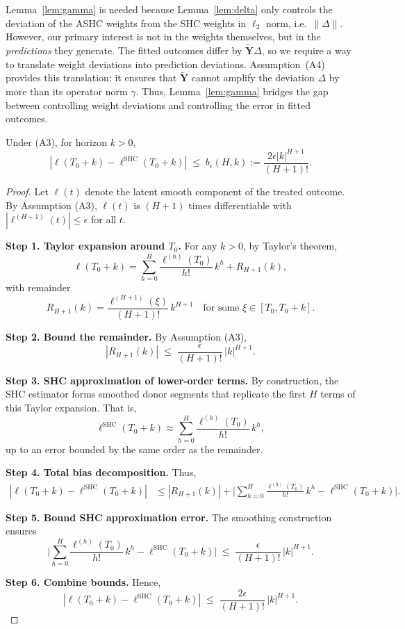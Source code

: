 \documentclass{article}
\begin{document}
\begin{remark}
Lemma~\ref{lem:gamma} is needed because Lemma~\ref{lem:delta} only controls the
deviation of the ASHC weights from the SHC weights in $\ell_2$ norm,
i.e.\ $\|\Delta\|$. However, our primary interest is not in the weights
themselves, but in the \emph{predictions} they generate. The fitted outcomes
differ by $\widetilde{\mathbf{Y}}\Delta$, so we require a way to translate
weight deviations into prediction deviations. Assumption~(A4) provides this
translation: it ensures that $\widetilde{\mathbf{Y}}$ cannot amplify the
deviation $\Delta$ by more than its operator norm $\gamma$. Thus, Lemma~\ref{lem:gamma}
bridges the gap between controlling weight deviations and controlling the error
in fitted outcomes.
\end{remark}


\begin{lemma}
\label{lem:smoothness}
Under (A3), for horizon $k > 0$,
\[
|\ell(T_0 + k) - \ell^{\text{SHC}}(T_0 + k)| 
\;\leq\; b_\epsilon(H,k) := \frac{2\epsilon |k|^{H+1}}{(H+1)!}.
\]
\end{lemma}

\begin{proof}
Let $\ell(t)$ denote the latent smooth component of the treated outcome. 
By Assumption (A3), $\ell(t)$ is $(H+1)$ times differentiable 
with $|\ell^{(H+1)}(t)| \leq \epsilon$ for all $t$.

\textbf{Step 1. Taylor expansion around $T_0$.}
For any $k > 0$, by Taylor’s theorem,
\[
\ell(T_0 + k)
= \sum_{h=0}^H \frac{\ell^{(h)}(T_0)}{h!}\, k^h 
+ R_{H+1}(k),
\]
with remainder
\[
R_{H+1}(k) = \frac{\ell^{(H+1)}(\xi)}{(H+1)!}\, k^{H+1}
\quad \text{for some } \xi \in [T_0, T_0 + k].
\]

\textbf{Step 2. Bound the remainder.}
By Assumption (A3),
\[
|R_{H+1}(k)| \;\leq\; \frac{\epsilon}{(H+1)!}\, |k|^{H+1}.
\]

\textbf{Step 3. SHC approximation of lower-order terms.}
By construction, the SHC estimator forms smoothed donor segments 
that replicate the first $H$ terms of this Taylor expansion. 
That is,
\[
\ell^{\text{SHC}}(T_0 + k)
\approx \sum_{h=0}^H \frac{\ell^{(h)}(T_0)}{h!}\, k^h,
\]
up to an error bounded by the same order as the remainder.

\textbf{Step 4. Total bias decomposition.}
Thus,
\begin{align*}
|\ell(T_0 + k) - \ell^{\text{SHC}}(T_0 + k)|
&\leq |R_{H+1}(k)| 
+ \Big|\sum_{h=0}^H \frac{\ell^{(h)}(T_0)}{h!}\, k^h 
- \ell^{\text{SHC}}(T_0 + k)\Big|.
\end{align*}

\textbf{Step 5. Bound SHC approximation error.}
The smoothing construction ensures
\[
\Big|\sum_{h=0}^H \frac{\ell^{(h)}(T_0)}{h!}\, k^h 
- \ell^{\text{SHC}}(T_0 + k)\Big|
\;\leq\; \frac{\epsilon}{(H+1)!}\, |k|^{H+1}.
\]

\textbf{Step 6. Combine bounds.}
Hence,
\[
|\ell(T_0 + k) - \ell^{\text{SHC}}(T_0 + k)|
\;\leq\;
\frac{2\epsilon}{(H+1)!}\, |k|^{H+1}.
\]
\end{proof}
\end{document}
